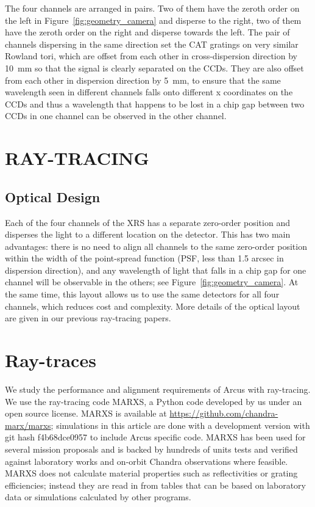\documentclass[12pt]{spieman}  %
\begin{document}
\begin{spacing}{1}
The four channels are arranged in pairs. Two of them have the zeroth order on the left in Figure~\ref{fig:geometry_camera} and disperse to the right, two of them have the zeroth order on the right and disperse towards the left. The pair of channels dispersing in the same direction set the CAT gratings on very similar Rowland tori, which are offset from each other in cross-dispersion direction by 10~mm so that the signal is clearly separated on the CCDs. They are also offset from each other in dispersion direction by 5~mm, to ensure that the same wavelength seen in different channels falls onto different x coordinates on the CCDs and thus a wavelength that happens to be lost in a chip gap between two CCDs in one channel can be observed in the other channel.

\section{RAY-TRACING}
\label{sect:raytracing}
\subsection{Optical Design}
\label{sect:design}

Each of the four channels of the XRS has a separate zero-order position and disperses the light to a different location on the detector. This has two main advantages: there is no need to align all channels to the same zero-order position within the width of the point-spread function (PSF, less than 1.5 arcsec in dispersion direction), and any wavelength of light that falls in a chip gap for one channel will be observable in the others; see Figure~\ref{fig:geometry_camera}. At the same time, this layout allows us to use the same detectors for all four channels, which reduces cost and complexity. More details of the optical layout are given in our previous ray-tracing papers\cite{10.1117/12.2273011,10.1117/12.2312678,DTRS}.

\section{Ray-traces}
We study the performance and alignment requirements of Arcus with ray-tracing. We use the ray-tracing code MARXS\cite{marxs1.1,2017AJ....154..243G}, a Python code developed by us under an open source license. MARXS is available at \url{https://github.com/chandra-marx/marxs}; simulations in this article are done with a development version with git hash f4b68dce0957 to include Arcus specific code. MARXS has been used for several mission proposals and is backed by hundreds of units tests and verified against laboratory works and on-orbit Chandra observations where feasible. MARXS does not calculate material properties such as reflectivities or grating efficiencies; instead they are read in from tables that can be based on laboratory data or simulations calculated by other programs.


\end{spacing}
\end{document}
